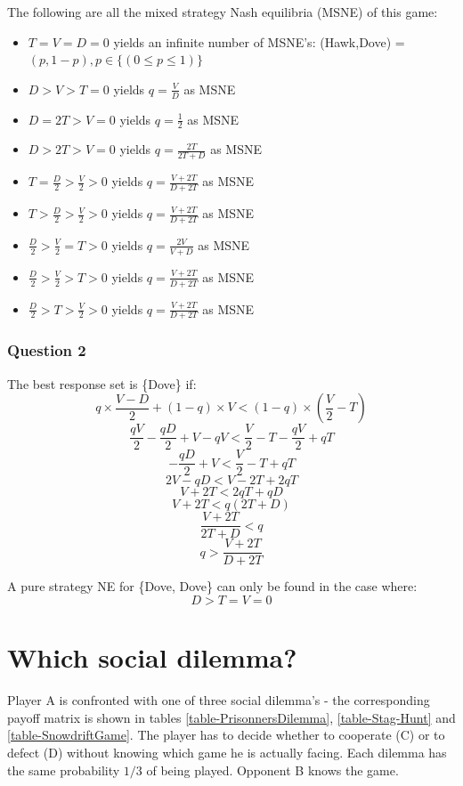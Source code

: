 \documentclass[a4paper, 11pt]{article}
\begin{document}
The following are all the mixed strategy Nash equilibria (MSNE) of this game:
\begin{itemize}[noitemsep]
  \setlength\itemsep{0.5em}
  \item $T=V=D=0$ yields an infinite number of MSNE's: (Hawk,Dove) = $(p,1-p), p \in \{(0\leq p \leq 1) \}$
  \item $D>V>T=0$ yields $q=\frac{V}{D}$ as MSNE
  \item $D=2T>V=0$ yields $q=\frac{1}{2}$ as MSNE
  \item $D>2T>V=0$ yields $q=\frac{2T}{2T+D}$ as MSNE
  \item $T=\frac{D}{2}>\frac{V}{2}>0$ yields $q=\frac{V+2T}{D+2T}$ as MSNE
  \item $T>\frac{D}{2}>\frac{V}{2}>0$ yields $q=\frac{V+2T}{D+2T}$ as MSNE
  \item $\frac{D}{2}>\frac{V}{2}=T>0$ yields $q=\frac{2V}{V+D}$ as MSNE
  \item $\frac{D}{2}>\frac{V}{2}>T>0$ yields $q=\frac{V+2T}{D+2T}$ as MSNE
  \item $\frac{D}{2}>T>\frac{V}{2}>0$ yields $q=\frac{V+2T}{D+2T}$ as MSNE
\end{itemize}

\subsubsection{Question 2}

The best response set is \{Dove\} if:
\[ q \times \frac{V-D}{2} + (1-q) \times V < (1-q) \times ( \frac{V}{2} - T) \]
\[ \frac{qV}{2} - \frac{qD}{2} + V - qV < \frac{V}{2} - T - \frac{qV}{2} + qT \]
\[ - \frac{qD}{2} + V  < \frac{V}{2} - T + qT \]
\[ 2V - qD < V - 2T + 2qT \]
\[ V + 2T < 2qT + qD \]
\[ V + 2T < q(2T + D) \]
\[ \frac{V + 2T}{2T + D} < q \]
\[ q > \frac{V+2T}{D+2T} \]

A pure strategy NE for \{Dove, Dove\} can only be found in the case where:
\[ D>T=V=0 \]

\newpage
\section{Which social dilemma?}

Player A is confronted with one of three social dilemma's - the corresponding payoff matrix is shown in tables \ref{table-PrisonnersDilemma}, \ref{table-Stag-Hunt} and \ref{table-SnowdriftGame}. The player has to decide whether to cooperate (C) or to defect (D) without knowing which game he is actually facing. Each dilemma has the same probability $1/3$ of being played. Opponent B knows the game.
\end{document}
